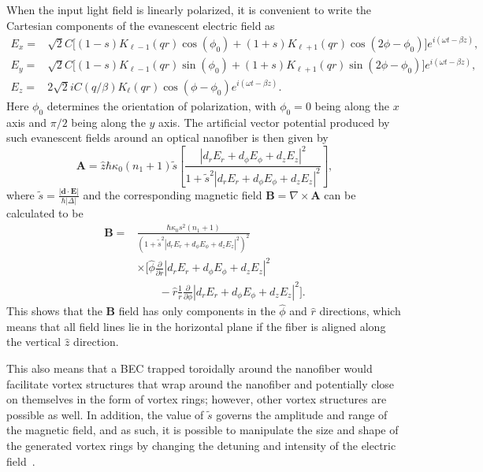When the input light field is linearly polarized, it is convenient to write the  Cartesian components of the evanescent electric field as 
\begin{align}
E_x =& \sqrt 2 C\Big[(1-s)K_{\ell-1}(qr)\cos(\phi_0)
      +(1+s)K_{\ell+1}(qr)\cos(2\phi-\phi_0)\Big]e^{i(\omega t - \beta z)}, \\
E_y =&\sqrt 2 C\Big[(1-s)K_{\ell-1}(qr)\sin(\phi_0)
      +(1+s)K_{\ell+1}(qr)\sin(2\phi-\phi_0)\Big]e^{i(\omega t - \beta z)}, \\
E_z = & 2\sqrt 2 i C(q/\beta)K_\ell(qr)\cos(\phi - \phi_0)e^{i(\omega t - \beta z)}.
\end{align}
Here $\phi_0$ determines the orientation of polarization, with $\phi_0 = 0$ being along the $x$ axis and $\pi/2$ being along the $y$ axis.
The artificial vector potential produced by such evanescent fields around an optical nanofiber is then given by \cite{sachdeva2017}
\begin{equation}
\mathbf{A} = \hat{z} \hbar \kappa_0 (n_1 + 1) \tilde{s} \left[\frac{|d_rE_r + d_{\phi}E_{\phi} + d_zE_z|^2}{1 + \tilde s^2|d_rE_r + d_{\phi}E_{\phi} + d_zE_z|^2} \right],
\end{equation}
where $\tilde s = \frac{|\mathbf{d}\cdot\mathbf{E}|}{\hbar |\Delta|}$ and
the corresponding magnetic field $\mathbf{B} = \nabla \times \mathbf{A}$ can be calculated to be
\begin{align}
\mathbf{B} =& \frac{\hbar \kappa_0 s^2(n_1 + 1)}{(1+\tilde s^2|d_rE_r + d_{\phi}E_{\phi} + d_zE_z|^2)^2} \nonumber\\
&\times \bigg[ \hat\phi  \frac{\partial}{\partial r} |d_rE_r + d_{\phi}E_{\phi} + d_zE_z|^2 \nonumber\\
&\qquad- \hat r \frac{1}{r} \frac{\partial}{\partial \phi} |d_rE_r + d_{\phi}E_{\phi} + d_zE_z|^2 \bigg ].
\end{align}
This shows that the $\mathbf{B}$ field has only components in the $\hat \phi$ and $\hat r$ directions, which means that all field lines lie in the horizontal plane if the fiber is aligned along the vertical $\hat z$ direction.

This also means that a BEC trapped toroidally around the nanofiber would facilitate vortex structures that wrap around the nanofiber and potentially close on themselves in the form of vortex rings; however, other vortex structures are possible as well.
In addition, the value of $\tilde s$ governs the amplitude and range of the magnetic field, and as such, it is possible to manipulate the size and shape of the generated vortex rings by changing the detuning and intensity of the electric field~\cite{sachdeva2017}.

